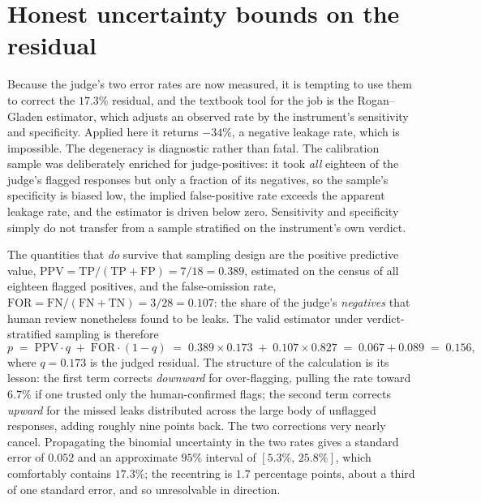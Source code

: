 \documentclass[12pt,a4paper]{report}
\begin{document}
\section{Honest uncertainty bounds on the residual}
\label{sec:ch5-bounds}

Because the judge's two error rates are now measured, it is tempting to use them to correct
the $17.3\%$ residual, and the textbook tool for the job is the Rogan--Gladen estimator,
which adjusts an observed rate by the instrument's sensitivity and specificity. Applied here
it returns $-34\%$, a negative leakage rate, which is impossible. The degeneracy is
diagnostic rather than fatal. The calibration sample was deliberately enriched for
judge-positives: it took \emph{all} eighteen of the judge's flagged responses but only a
fraction of its negatives, so the sample's specificity is biased low, the implied
false-positive rate exceeds the apparent leakage rate, and the estimator is driven below
zero. Sensitivity and specificity simply do not transfer from a sample stratified on the
instrument's own verdict.

The quantities that \emph{do} survive that sampling design are the positive predictive value,
$\mathrm{PPV} = \mathrm{TP}/(\mathrm{TP}+\mathrm{FP}) = 7/18 = 0.389$, estimated on the census of all
eighteen flagged positives, and the false-omission rate,
$\mathrm{FOR} = \mathrm{FN}/(\mathrm{FN}+\mathrm{TN}) = 3/28 = 0.107$: the share of the judge's
\emph{negatives} that human review nonetheless found to be leaks. The valid
estimator under verdict-stratified sampling is therefore
\[
  p \;=\; \mathrm{PPV}\cdot q \;+\; \mathrm{FOR}\cdot(1-q)
    \;=\; 0.389 \times 0.173 \;+\; 0.107 \times 0.827
    \;=\; 0.067 + 0.089 \;=\; 0.156,
\]
where $q = 0.173$ is the judged residual. The structure of the calculation is its lesson: the
first term corrects \emph{downward} for over-flagging, pulling the rate toward $6.7\%$ if one
trusted only the human-confirmed flags; the second term corrects \emph{upward} for the missed
leaks distributed across the large body of unflagged responses, adding roughly nine points
back. The two corrections very nearly cancel. Propagating the binomial uncertainty in the two
rates gives a standard error of $0.052$ and an approximate $95\%$ interval of
$[5.3\%,\,25.8\%]$, which comfortably contains $17.3\%$; the recentring is $1.7$ percentage
points, about a third of one standard error, and so unresolvable in direction.
\end{document}
